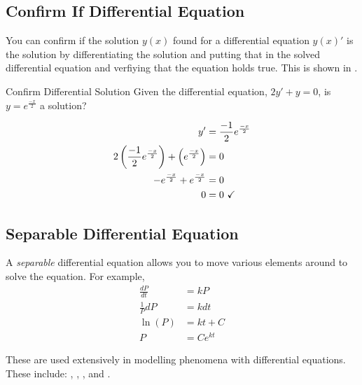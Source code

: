 \subsection{Confirm If Differential Equation} \label{subsec:Confirm Differential Equation}
You can confirm if the solution $y \left( x \right)$ found for a differential equation $y \left( x \right)'$ is the solution by differentiating the solution and putting that in the solved differential equation and verfiying that the equation holds true.
This is shown in .
\begin{example}[]{Confirm Differential Solution}
  Given the differential equation, $2y' + y = 0$, is $y = e^{\frac{-x}{2}}$ a solution? \newline

  \tcblower

  \begin{align*}
    y' &= \frac{-1}{2} e^{\frac{-x}{2}} \\
    2 \left( \frac{-1}{2} e^{\frac{-x}{2}} \right) + \left( e^{\frac{-x}{2}} \right) &= 0 \\
    -e^{\frac{-x}{2}} + e^{\frac{-x}{2}} &= 0 \\
    0 &= 0 \text{ \checkmark}
  \end{align*}
\end{example}

\subsection{Separable Differential Equation} \label{subsec:Separable Differential Equation}
\begin{definition}[Separable] \label{def:Separable}
  A \emph{separable} differential equation allows you to move various elements around to solve the equation.
  For example,
  \begin{align*}
    \frac{dP}{dt} &= kP \\
    \frac{1}{P} dP &= k dt \\
    \ln \left( P \right) &= kt + C \\
    P &= Ce^{kt}
  \end{align*}
  \begin{remark}
    These are used extensively in modelling phenomena with differential equations.
    These include: , , , and .
  \end{remark}
\end{definition}


